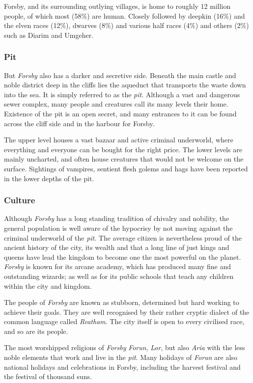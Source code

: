 Forsby, and its surrounding outlying villages, is home to roughly 12 million
people, of which most (58\%) are human. Closely followed by deepkin (16\%)
and the elven races (12\%), dwarves (8\%) and various half races (4\%) and
others (2\%) such as Diarim and Umgeher.

\subsubsection{Pit}

But \emph{Forsby} also has a darker and secretive side. Beneath the main
castle and noble district deep in the cliffs lies the aqueduct that transports
the waste down into the sea. It is simply referred to as the \emph{pit}.
Although a vast and dangerous sewer complex, many people and creatures call
its many levels their home. Existence of the pit is an open secret, and many
entrances to it can be found across the cliff side and in the harbour for
Forsby.

The upper level houses a vast bazaar and active criminal underworld, where
everything and everyone can be bought for the right price. The lower levels
are mainly uncharted, and often house creatures that would not be welcome on
the surface. Sightings of vampires, sentient flesh golems and hags have been
reported in the lower depths of the pit.

\subsubsection{Culture}

Although \emph{Forsby} has a long standing tradition of chivalry and nobility,
the general population is well aware of the hypocrisy by not moving against the
criminal underworld of the \emph{pit}. The average citizen is nevertheless
proud of the ancient history of the city, its wealth and that a long line of
just kings and queens have lead the kingdom to become one the most powerful on
the planet. \emph{Forsby} is known for its arcane academy, which has produced
many fine and outstanding wizards; as well as for its public schools that
teach any children within the city and kingdom.

The people of \emph{Forsby} are known as stubborn, determined but hard working
to achieve their goals. They are well recognised by their rather cryptic dialect
of the common language called \emph{Reatham}. The city itself is open to every
civilised race, and so are its people.

The most worshipped religions of \emph{Forsby} \emph{Forun}, \emph{Lor}, but
also \emph{Aria} with the less noble elements that work and live in the
\emph{pit}. Many holidays of \emph{Forun} are also national holidays and
celebrations in Forsby, including the harvest festival and the festival of
thousand suns.


